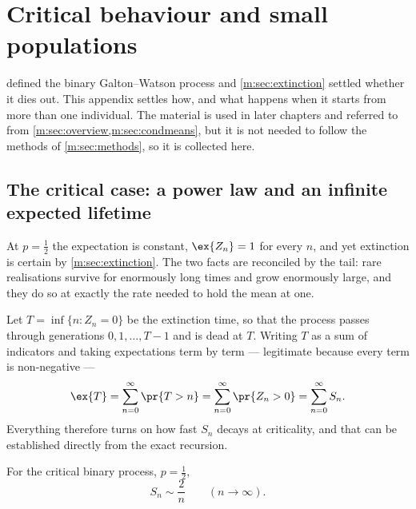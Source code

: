 \renewcommand{\thesection}{\thechapter.\Alph{section}}
\setcounter{section}{0}

\section{Critical behaviour and small populations}
\label{m:app:criticalgw}

 defined the binary Galton--Watson process and
\cref{m:sec:extinction} settled whether it dies out. This appendix settles how, and
what happens when it starts from more than one individual. The material is used in
later chapters and referred to from \cref{m:sec:overview,m:sec:condmeans}, but it is
not needed to follow the methods of \cref{m:sec:methods}, so it is collected here.

\subsection{The critical case: a power law and an infinite expected lifetime}
\label{m:app:critical}

At $p=\tfrac12$ the expectation is constant, $\ex{Z_n}=1$ for every $n$, and yet
extinction is certain by \cref{m:sec:extinction}. The two facts are reconciled by
the tail: rare realisations survive for enormously long times and grow enormously
large, and they do so at exactly the rate needed to hold the mean at one.

Let $T=\inf\{n:Z_n=0\}$ be the extinction time, so that the process passes through
generations $0,1,\dots,T-1$ and is dead at $T$. Writing $T$ as a sum of indicators
and taking expectations term by term --- legitimate because every term is
non-negative ---
\begin{equation}
\label{m:eq:ETsumSn}
\ex{T} = \sum_{n=0}^{\infty}\pr{T>n} = \sum_{n=0}^{\infty}\pr{Z_n>0}
= \sum_{n=0}^{\infty}S_n .
\end{equation}
Everything therefore turns on how fast $S_n$ decays at criticality, and that can be
established directly from the exact recursion.

\begin{proposition}
\label{m:prop:criticalSn}
For the critical binary process, $p=\tfrac12$,
\begin{equation}
\label{m:eq:twoovern}
S_n\sim\frac{2}{n}\qquad(n\to\infty).
\end{equation}
\end{proposition}

